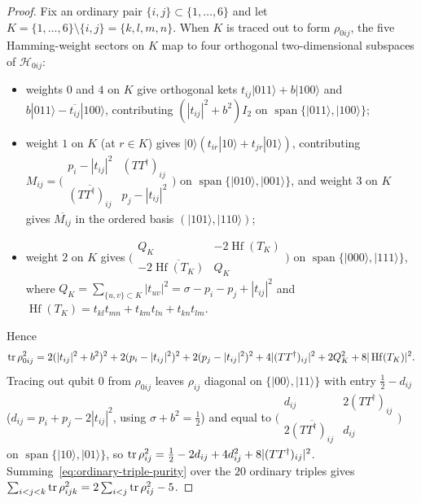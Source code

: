 \begin{proof}
Fix an ordinary pair $\{i,j\}\subset\{1,\ldots,6\}$ and let $K=\{1,\ldots,6\}\setminus\{i,j\}=\{k,l,m,n\}$.
When $K$ is traced out to form $\rho_{0ij}$, the five Hamming-weight sectors on $K$ map to four orthogonal two-dimensional subspaces of $\mathcal H_{0ij}$:
\begin{itemize}
\item weights $0$ and $4$ on $K$ give orthogonal kets $t_{ij}|011\rangle+b|100\rangle$ and $b|011\rangle-\overline{t_{ij}}|100\rangle$, contributing $(|t_{ij}|^2+b^2)I_2$ on $\operatorname{span}\{|011\rangle,|100\rangle\}$;
\item weight $1$ on $K$ (at $r\in K$) gives $|0\rangle(t_{ir}|10\rangle+t_{jr}|01\rangle)$, contributing $M_{ij}=\bigl(\begin{smallmatrix}p_i-|t_{ij}|^2&(TT^\dagger)_{ij}\\\overline{(TT^\dagger)_{ij}}&p_j-|t_{ij}|^2\end{smallmatrix}\bigr)$ on $\operatorname{span}\{|010\rangle,|001\rangle\}$, and weight $3$ on $K$ gives $\overline{M_{ij}}$ in the ordered basis $(|101\rangle,|110\rangle)$;
\item weight $2$ on $K$ gives $\bigl(\begin{smallmatrix}Q_K&-2\operatorname{Hf}(T_K)\\-2\overline{\operatorname{Hf}(T_K)}&Q_K\end{smallmatrix}\bigr)$ on $\operatorname{span}\{|000\rangle,|111\rangle\}$, where $Q_K=\sum_{\{u,v\}\subset K}|t_{uv}|^2=\sigma-p_i-p_j+|t_{ij}|^2$ and $\operatorname{Hf}(T_K)=t_{kl}t_{mn}+t_{km}t_{ln}+t_{kn}t_{lm}$.
\end{itemize}
Hence
\[
 \operatorname{tr}\rho_{0ij}^2=2(|t_{ij}|^2+b^2)^2+2(p_i-|t_{ij}|^2)^2+2(p_j-|t_{ij}|^2)^2+4|(TT^\dagger)_{ij}|^2+2Q_K^2+8|\operatorname{Hf}(T_K)|^2.
\]
Tracing out qubit $0$ from $\rho_{0ij}$ leaves $\rho_{ij}$ diagonal on $\{|00\rangle,|11\rangle\}$ with entry $\tfrac12-d_{ij}$ ($d_{ij}=p_i+p_j-2|t_{ij}|^2$, using $\sigma+b^2=\tfrac12$) and equal to $\bigl(\begin{smallmatrix}d_{ij}&2(TT^\dagger)_{ij}\\2\overline{(TT^\dagger)_{ij}}&d_{ij}\end{smallmatrix}\bigr)$ on $\operatorname{span}\{|10\rangle,|01\rangle\}$, so $\operatorname{tr}\rho_{ij}^2=\tfrac12-2d_{ij}+4d_{ij}^2+8|(TT^\dagger)_{ij}|^2$. Summing~\eqref{eq:ordinary-triple-purity} over the $20$ ordinary triples gives $\sum_{i<j<k}\operatorname{tr}\rho_{ijk}^2=2\sum_{i<j}\operatorname{tr}\rho_{ij}^2-5$.


\end{proof}
